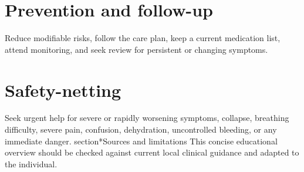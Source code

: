 \section*{Prevention and follow-up}
Reduce modifiable risks, follow the care plan, keep a current medication list, attend monitoring, and seek review for persistent or changing symptoms.
\section*{Safety-netting}
Seek urgent help for severe or rapidly worsening symptoms, collapse, breathing difficulty, severe pain, confusion, dehydration, uncontrolled bleeding, or any immediate danger.
section*{Sources and limitations}
This concise educational overview should be checked against current local clinical guidance and adapted to the individual.
